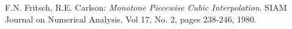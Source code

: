 \begin{thebibliography}{99}


 F.N. Fritsch, R.E. Carlson: \textit{Monotone Piecewise Cubic Interpolation}. SIAM Journal on Numerical Analysis, Vol 17, No. 2, pages 238-246, 1980.

\end{thebibliography}